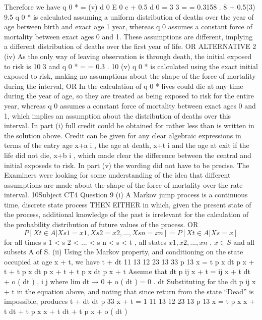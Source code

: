 \documentclass[a4paper,12pt]{article}
\begin{document}
\begin{enumerate}
Therefore we have
q 0 * =
(v)
d 0
E 0 c
+ 0.5 d 0
=
3
3
=
= 0.3158 .
8 + 0.5(3) 9.5
q 0 * is calculated assuming a uniform distribution of deaths over the year of age
between birth and exact age 1 year, whereas q 0 assumes a constant force of mortality
between exact ages 0 and 1.
These assumptions are different, implying a different distribution of deaths over the
first year of life.
OR ALTERNATIVE 2
(iv) As the only way of leaving observation is through death, the initial exposed to risk is 10
3
and q 0 * =
= 0.3 .
10
(v) q 0 * is calculated using the exact initial exposed to risk, making no assumptions about
the shape of the force of mortality during the interval,
OR
In the calculation of q 0 * lives could die at any time during the year of age, so they are
treated as being exposed to risk for the entire year, whereas q 0 assumes a constant force
of mortality between exact ages 0 and 1, which implies an assumption about the
distribution of deaths over this interval.
In part (i) full credit could be obtained for rather less than is written in the solution above.
Credit can be given for any clear algebraic expressions in terms of the entry age x+a i , the
age at death, x+t i and the age at exit if the life did not die, x+b i , which made clear the
difference between the central and initial exposeds to risk.
In part (v) the wording did not have to be precise. The Examiners were looking for some
understanding of the idea that different assumptions are made about the shape of the force of
mortality over the rate interval.
10Subject CT4 %
Question 9
(i)
A Markov jump process is a continuous time, discrete state process
THEN EITHER
in which, given the present state of the process, additional knowledge of the past is
irrelevant for the calculation of the probability distribution of future values of the
process.
OR
\[P [ X t ∈ A | X s 1 = x 1 , X s 2 = x 2 ,..., X s n = x n ] = P [ X t ∈ A | X s = x ]\]
for all times s 1 < s 2 < ... < s n < s < t , all states $x 1 , x 2 ,..., x n$ , $x \in S$ and all subsets A of S.
(ii)
Using the Markov property, and conditioning on the state occupied
at age x + t, we have
t + dt
11
13
12
23
13
33
p 13
x = t p x dt p x + t + t p x dt p x + t + t p x dt p x + t
Assume that
dt
p ij x + t = \mu ij x + t dt + o ( dt ) , i \neq j
where lim
dt → 0
+
o ( dt )
= 0 .
dt
Substituting for the dt p ij x + t in the equation above, and noting that
since return from the state “Dead” is impossible, produces
t + dt
dt
p 33
x + t = 1
11 13
12 23
13
p 13
x = t p x \mu x + t dt + t p x \mu x + t dt + t p x + o ( dt )

\end{enumerate}
\end{document}
